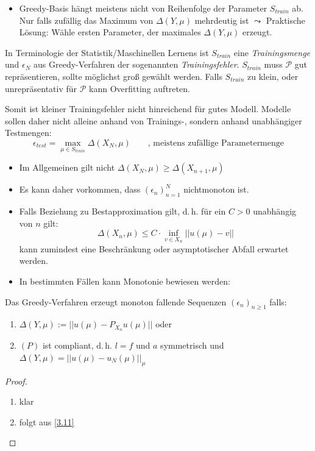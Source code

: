\begin{bem}[Reihenfolge] \beginwithlistbem
	\begin{itemize}
		\item Greedy-Basis hängt meistens nicht von Reihenfolge der Parameter $S_{train}$ ab. Nur falls zufällig das Maximum von $\Delta(Y,\mu)$ mehrdeutig ist $\leadsto$ Praktische Lösung: Wähle ersten Parameter, der maximales $\Delta(Y,\mu)$ erzeugt.
	\end{itemize}
\end{bem}

\begin{bem}
In Terminologie der Statistik/Maschinellen Lernens ist $S_{train}$ eine \emph{Trainingsmenge} und $\epsilon_N$ aus Greedy-Verfahren der sogenannten \emph{Trainingsfehler}. $S_{train}$ muss $\mathcal{P}$ gut repräsentieren, sollte möglichst groß gewählt werden. Falls $S_{train}$ zu klein, oder unrepräsentativ für $\mathcal{P}$ kann Overfitting auftreten.

Somit ist kleiner Trainingsfehler nicht hinreichend für gutes Modell. Modelle sollen daher nicht alleine anhand von Trainings-, sondern anhand unabhängiger Testmengen:
\[
	\epsilon_{test} = \max\limits_{\mu \in S_{train}} \Delta(X_N,\mu) \qquad \text{, meistens zufällige Parametermenge}
\]
\end{bem}

\begin{bem}[Monotonie] \beginwithlistbem
	\begin{itemize}
		\item Im Allgemeinen gilt nicht $\Delta(X_N,\mu) \geq \Delta(X_{n+1},\mu)$
		\item Es kann daher vorkommen, dass $(\epsilon_n)_{n=1}^N$ nichtmonoton ist.
		\item Falls Beziehung zu Bestapproximation gilt, d.\,h. für ein $C > 0$ unabhängig von $n$ gilt:
		\[
			\Delta(X_n,\mu) \leq C \cdot \inf\limits_{v \in X_n} ||u(\mu) - v||
		\]
		kann zumindest eine Beschränkung oder asymptotischer Abfall erwartet werden.
		\item In bestimmten Fällen kann Monotonie bewiesen werden:
	\end{itemize}
\end{bem}

\begin{satz}
Das Greedy-Verfahren erzeugt monoton fallende Sequenzen $(\epsilon_n)_{n\geq 1}$ falls:
\begin{enumerate}
	\item $\Delta (Y,\mu) := ||u(\mu) - P_{X_n}u(\mu)||$ oder
	\item $(P)$ ist compliant, d.\,h. $l=f$ und $a$ symmetrisch und $\Delta(Y,\mu) = ||u(\mu) - u_N(\mu)||_{\mu}$
\end{enumerate}
\begin{proof}
	\begin{enumerate}
	\item klar
	\item folgt aus \ref{3.11}
	\end{enumerate}
\end{proof}
\end{satz}

